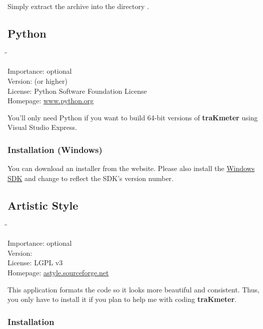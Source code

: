 Simply extract the archive into the directory
.

\subsection{Python}

\begin{tabbing}
  \hspace*{6em}\=\=\kill

  Importance:  \> optional \\
  Version:      (or higher) \\
  License:     \> Python Software Foundation License \\
  Homepage:    \> \href{http://www.python.org/}{www.python.org}
\end{tabbing}

You'll only need Python if you want to build \num{64}-bit versions of
\textbf{traKmeter} using Visual Studio Express.

\subsubsection{Installation (Windows)}

You can download an installer from the website.  Please also install
the \href{http://msdn.microsoft.com/windows/bb980924.aspx}{Windows
  SDK} and change  to reflect the SDK's version
number.

\subsection{Artistic Style}

\begin{tabbing}
  \hspace*{6em}\=\=\kill

  Importance:  \> optional \\
  Version:      \\
  License:     \> LGPL v3 \\
  Homepage:    \> \href{http://astyle.sourceforge.net/}{astyle.sourceforge.net}
\end{tabbing}

This application formats the code so it looks more beautiful and
consistent.  Thus, you only have to install it if you plan to help me
with coding \textbf{traKmeter}.

\subsubsection{Installation}

